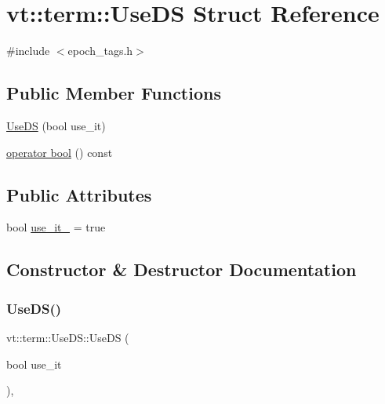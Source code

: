 \hypertarget{structvt_1_1term_1_1_use_d_s}{}\section{vt\+:\+:term\+:\+:Use\+DS Struct Reference}
\label{structvt_1_1term_1_1_use_d_s}


{\ttfamily \#include $<$epoch\+\_\+tags.\+h$>$}

\subsection*{Public Member Functions}
\begin{DoxyCompactItemize}
\item 
\hyperlink{structvt_1_1term_1_1_use_d_s_a29261f18f8f9303bbad2c8ee27f352ad}{Use\+DS} (bool use\+\_\+it)
\item 
\hyperlink{structvt_1_1term_1_1_use_d_s_a054eedc5eedc9ea9c900bd9080ba8de2}{operator bool} () const
\end{DoxyCompactItemize}
\subsection*{Public Attributes}
\begin{DoxyCompactItemize}
\item 
bool \hyperlink{structvt_1_1term_1_1_use_d_s_a90e938697cc42b12536e2b5d1a6c6c2d}{use\+\_\+it\+\_\+} = true
\end{DoxyCompactItemize}


\subsection{Constructor \& Destructor Documentation}
\mbox{\label{structvt_1_1term_1_1_use_d_s_a29261f18f8f9303bbad2c8ee27f352ad}} 
\subsubsection{\texorpdfstring{Use\+D\+S()}{UseDS()}}
{\footnotesize\ttfamily vt\+::term\+::\+Use\+D\+S\+::\+Use\+DS (\begin{DoxyParamCaption}\item[{bool}]{use\+\_\+it }\end{DoxyParamCaption})\hspace{0.3cm}{\ttfamily [inline]}, {\ttfamily [explicit]}}



